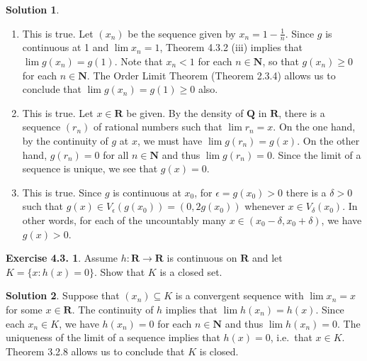 \documentclass[12pt]{article}
\theoremstyle{definition}
\theoremstyle{exercise}
\newtheorem{exercise}{Exercise 4.3.}
\theoremstyle{solution}
\newtheorem*{solution}{Solution}
\newcommand{\N}{\mathbf{N}}
\newcommand{\Q}{\mathbf{Q}}
\newcommand{\R}{\mathbf{R}}
\begin{document}
\begin{solution}
    \begin{enumerate}
        \item This is true. Let \( (x_n) \) be the sequence given by \( x_n = 1 - \tfrac{1}{n} \). Since \( g \) is continuous at 1 and \( \lim x_n = 1 \), Theorem 4.3.2 (iii) implies that \( \lim g(x_n) = g(1) \). Note that \( x_n < 1 \) for each \( n \in \N \), so that \( g(x_n) \geq 0 \) for each \( n \in \N \). The Order Limit Theorem (Theorem 2.3.4) allows us to conclude that \( \lim g(x_n) = g(1) \geq 0 \) also.

        \item This is true. Let \( x \in \R \) be given. By the density of \( \Q \) in \( \R \), there is a sequence \( (r_n) \) of rational numbers such that \( \lim r_n = x \). On the one hand, by the continuity of \( g \) at \( x \), we must have \( \lim g(r_n) = g(x) \). On the other hand, \( g(r_n) = 0 \) for all \( n \in \N \) and thus \( \lim g(r_n) = 0 \). Since the limit of a sequence is unique, we see that \( g(x) = 0 \).
        
        \item This is true. Since \( g \) is continuous at \( x_0 \), for \( \epsilon = g(x_0) > 0 \) there is a \( \delta > 0 \) such that \( g(x) \in V_{\epsilon}(g(x_0)) = (0, 2 g(x_0)) \) whenever \( x \in V_{\delta}(x_0) \). In other words, for each of the uncountably many \( x \in (x_0 - \delta, x_0 + \delta) \), we have \( g(x) > 0 \).
    \end{enumerate}
\end{solution}

\begin{exercise}
\label{ex:9}
    Assume \( h : \R \to \R \) is continuous on \( \R \) and let \( K = \{ x : h(x) = 0 \} \). Show that \( K \) is a closed set.
\end{exercise}

\begin{solution}
    Suppose that \( (x_n) \subseteq K \) is a convergent sequence with \( \lim x_n = x \) for some \( x \in \R \). The continuity of \( h \) implies that \( \lim h(x_n) = h(x) \). Since each \( x_n \in K \), we have \( h(x_n) = 0 \) for each \( n \in \N \) and thus \( \lim h(x_n) = 0 \). The uniqueness of the limit of a sequence implies that \( h(x) = 0 \), i.e.\ that \( x \in K \). Theorem 3.2.8 allows us to conclude that \( K \) is closed.
\end{solution}
\end{document}
